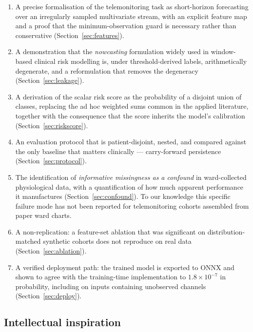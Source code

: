 \documentclass[11pt,a4paper]{article}
\begin{document}
\begin{enumerate}
\item A precise formalisation of the telemonitoring task as short-horizon
forecasting over an irregularly sampled multivariate stream, with an explicit
feature map and a proof that the minimum-observation guard is necessary rather
than conservative (Section~\ref{sec:features}).

\item A demonstration that the \emph{nowcasting} formulation widely used in
window-based clinical risk modelling is, under threshold-derived labels,
arithmetically degenerate, and a reformulation that removes the degeneracy
(Section~\ref{sec:leakage}).

\item A derivation of the scalar risk score as the probability of a disjoint union
of classes, replacing the ad hoc weighted sums common in the applied literature,
together with the consequence that the score inherits the model's calibration
(Section~\ref{sec:riskscore}).

\item An evaluation protocol that is patient-disjoint, nested, and compared against
the only baseline that matters clinically --- carry-forward persistence
(Section~\ref{sec:protocol}).

\item The identification of \emph{informative missingness as a confound} in
ward-collected physiological data, with a quantification of how much apparent
performance it manufactures (Section~\ref{sec:confound}). To our knowledge this
specific failure mode has not been reported for telemonitoring cohorts assembled
from paper ward charts.

\item A non-replication: a feature-set ablation that was significant on
distribution-matched synthetic cohorts does not reproduce on real data
(Section~\ref{sec:ablation}).

\item A verified deployment path: the trained model is exported to ONNX and shown
to agree with the training-time implementation to $1.8\times10^{-7}$ in
probability, including on inputs containing unobserved channels
(Section~\ref{sec:deploy}).
\end{enumerate}

\subsection{Intellectual inspiration}
\end{document}
